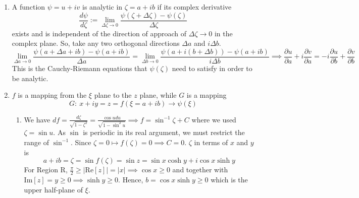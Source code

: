 \documentclass[a4paper]{article}
\begin{document}
\begin{ans}\leavevmode
\begin{enumerate}[label=(\alph*)]
\item A function $\psi=u+iv$ is analytic in $\zeta=a+ib$ if its complex derivative
$$\frac{d\psi}{d\zeta}:=\lim_{\Delta \zeta\rightarrow0}\frac{\psi(\zeta+\Delta\zeta)-\psi(\zeta)}{\Delta\zeta}$$
exists and is independent of the direction of approach of $\Delta\zeta\rightarrow0$ in the complex plane. So, take any two orthogonal directions $\Delta a$ and $i\Delta b$.
$$\lim_{\Delta a\rightarrow0}\frac{\psi(a+\Delta a+ib)-\psi(a+ib)}{\Delta a}=\lim_{\Delta b\rightarrow0}\frac{\psi(a+i(b+\Delta b))-\psi(a+ib)}{i\Delta b}\implies\frac{\partial u}{\partial a}+i\frac{\partial v}{\partial a}=-i\frac{\partial u}{\partial b}+\frac{\partial v}{\partial b}$$
This is the Cauchy-Riemann equations that $\psi(\zeta)$ need to satisfy in order to be analytic.
\item $f$ is a mapping from the $\xi$ plane to the $z$ plane, while $G$ is a mapping  
$$G:~x+iy=z=f(\xi=a+ib)\rightarrow\psi(\xi)$$
\begin{enumerate}[label=(\roman*)]
\item 
We have $df=\frac{d\zeta}{\sqrt{1-\zeta^2}}=\frac{\cos u du}{\sqrt{1-\sin^2u}}\implies f=\sin^{-1}\zeta+C$ where we used $\zeta=\sin u$. As $\sin$ is periodic in its real argument, we must restrict the range of $\sin^{-1}$. Since $\zeta=0\mapsto f(\zeta)=0\implies C=0$. $\zeta$ in terms of $x$ and $y$ is
$$a+ib=\zeta=\sin f(\zeta)=\sin z=\sin x\cosh y+i\cos x\sinh y$$
For Region R, $\frac{\pi}{2}\geq|\text{Re}[z]|=|x|\implies\cos x\geq0$ and together with $\text{Im}[z]=y\geq0\implies\sinh y\geq0$. Hence, $b=\cos x\sinh y\geq0$ which is the upper half-plane of $\xi$.
      \begin{center}
\end{center}
\end{enumerate}
\end{enumerate}
\end{ans}
\end{document}
